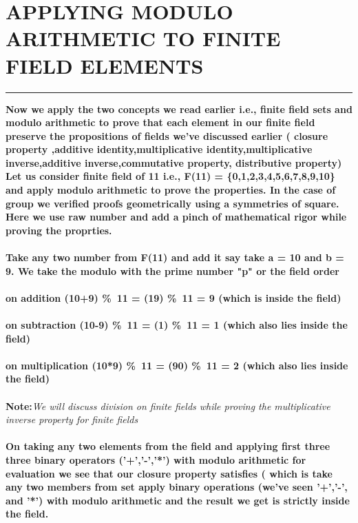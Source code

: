 \documentclass{article}
\begin{document}
\section * {APPLYING MODULO ARITHMETIC TO FINITE FIELD ELEMENTS}
\hrule
\bigskip 
\textbf{Now we apply the two concepts we read earlier i.e., finite field sets and modulo arithmetic to prove that each element in our finite field preserve the  propositions  of fields  we've discussed earlier ( closure property ,additive identity,multiplicative identity,multiplicative inverse,additive inverse,commutative property, distributive property)
}
\\
\textbf{Let us consider finite field of 11 i.e., F(11) = \{0,1,2,3,4,5,6,7,8,9,10\} and apply modulo arithmetic to prove the properties. In the case of group we verified proofs geometrically using a symmetries of square. Here we use raw number and add a pinch of mathematical rigor while proving the proprties.
\\ 
\\
Take any two number from F(11) and add it say take a = 10 and b = 9. We take the modulo with the prime number "p" or the field order 
\\
\\
on addition (10+9) \%\ 11 = (19) \%\ 11 = 9 (which is inside the field)
\\
\\
on subtraction (10-9) \%\ 11 = (1) \%\ 11 = 1  (which also lies inside the field)
\\
\\
on multiplication (10*9) \%\ 11 = (90) \%\ 11 = 2 (which also lies inside the field)}
\\
\\
\textbf{Note:}\textit{We will discuss division on finite fields  while proving the multiplicative inverse property for finite fields} 
\\
\\
\textbf{On taking any two elements from the field and applying first three three binary operators ('+','-','*') with modulo arithmetic for evaluation we see that our closure property satisfies ( which is take any two members from set apply binary operations (we've seen '+','-', and '*') with modulo arithmetic  and the result we get is strictly inside the field.}

\pagebreak 
\end{document}
